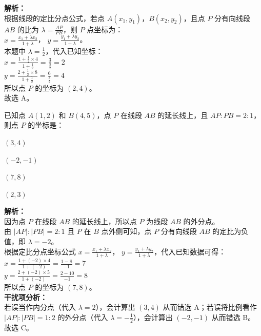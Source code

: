 \begin{solution}
    \textbf{解析：} \\
    根据线段的定比分点公式，若点 $A(x_1, y_1)$，$B(x_2, y_2)$，且点 $P$ 分有向线段 $AB$ 的比为 $\lambda = \frac{AP}{PB}$，则 $P$ 点坐标为： \\
    $x = \frac{x_1 + \lambda x_2}{1 + \lambda}$， $y = \frac{y_1 + \lambda y_2}{1 + \lambda}$。 \\
    本题中 $\lambda = \frac{1}{2}$，代入已知坐标： \\
    $x = \frac{1 + \frac{1}{2} \times 4}{1 + \frac{1}{2}} = \frac{3}{\frac{3}{2}} = 2$ \\
    $y = \frac{2 + \frac{1}{2} \times 8}{1 + \frac{1}{2}} = \frac{6}{\frac{3}{2}} = 4$ \\
    所以点 $P$ 的坐标为 $(2, 4)$。 \\
    故选 A。
\end{solution}

\begin{question}
    已知点 $A(1, 2)$ 和 $B(4, 5)$，点 $P$ 在线段 $AB$ 的延长线上，且 $AP:PB = 2:1$，则点 $P$ 的坐标是： \paren[C]
    \begin{choices}
        \item $(3, 4)$ \item $(-2, -1)$ \item $(7, 8)$ \item $(2, 3)$
    \end{choices}
\end{question}
\begin{solution}
    \textbf{解析：} \\
    因为点 $P$ 在线段 $AB$ 的延长线上，所以点 $P$ 为线段 $AB$ 的外分点。 \\
    由 $|AP|:|PB| = 2:1$ 且 $P$ 在 $B$ 点外侧可知，点 $P$ 分有向线段 $AB$ 的定比为负值，即 $\lambda = -2$。 \\
    根据定比分点坐标公式 $x = \frac{x_1 + \lambda x_2}{1 + \lambda}$， $y = \frac{y_1 + \lambda y_2}{1 + \lambda}$，代入已知数据可得： \\
    $x = \frac{1 + (-2) \times 4}{1 + (-2)} = \frac{1 - 8}{-1} = 7$ \\
    $y = \frac{2 + (-2) \times 5}{1 + (-2)} = \frac{2 - 10}{-1} = 8$ \\
    所以点 $P$ 的坐标为 $(7, 8)$。 \\
    \textbf{干扰项分析：} \\
    若误当作内分点（代入 $\lambda = 2$），会计算出 $(3, 4)$ 从而错选 A；若误将比例看作 $|AP|:|PB| = 1:2$ 的外分点（代入 $\lambda = -\frac{1}{2}$），会计算出 $(-2, -1)$ 从而错选 B。 \\
    故选 C。
\end{solution}

